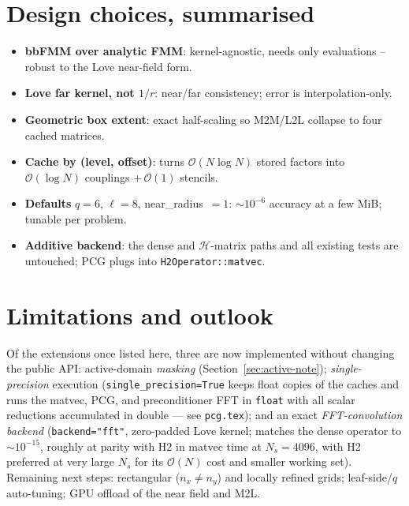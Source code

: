 \documentclass[11pt,a4paper]{article}
\newcommand{\Order}{\mathcal{O}}
\begin{document}
\section{Design choices, summarised}
\begin{itemize}
\item \textbf{bbFMM over analytic FMM}: kernel-agnostic, needs only
evaluations -- robust to the Love near-field form.
\item \textbf{Love far kernel, not $1/r$}: near/far consistency; error is
interpolation-only.
\item \textbf{Geometric box extent}: exact half-scaling so M2M/L2L collapse
to four cached matrices.
\item \textbf{Cache by (level, offset)}: turns $\Order(N\log N)$ stored
factors into $\Order(\log N)$ couplings $+\,\Order(1)$ stencils.
\item \textbf{Defaults} $q=6$, $\ell=8$, near\_radius~$=1$: $\sim10^{-6}$
accuracy at a few MiB; tunable per problem.
\item \textbf{Additive backend}: the dense and $\mathcal{H}$-matrix paths and
all existing tests are untouched; PCG plugs into \texttt{H2Operator::matvec}.
\end{itemize}

\section{Limitations and outlook}
Of the extensions once listed here, three are now implemented without
changing the public API: active-domain \emph{masking}
(Section~\ref{sec:active-note}); \emph{single-precision} execution
(\texttt{single\_precision=True} keeps float copies of the caches and runs
the matvec, PCG, and preconditioner FFT in \texttt{float} with all scalar
reductions accumulated in double --- see \texttt{pcg.tex}); and an exact
\emph{FFT-convolution backend} (\texttt{backend="fft"}, zero-padded Love
kernel; matches the dense operator to $\sim10^{-15}$, roughly at parity with
H2 in matvec time at $N_s=4096$, with H2 preferred at very large $N_s$ for
its $\Order(N)$ cost and smaller working set). Remaining next steps:
rectangular ($n_x\neq n_y$) and locally refined grids; leaf-side/$q$
auto-tuning; GPU offload of the near field and M2L.



\end{document}
